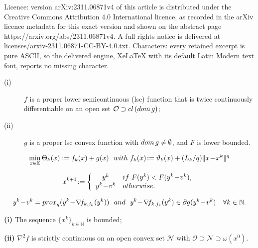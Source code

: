 \documentclass[10pt,a4paper]{amsart}
\begin{document}
Licence: version arXiv:2311.06871v4 of this article is distributed under the Creative Commons Attribution 4.0 International licence, as recorded in the arXiv licence metadata for this exact version and shown on the abstract page https://arxiv.org/abs/2311.06871v4. A full rights notice is delivered at licenses/arxiv-2311.06871-CC-BY-4.0.txt. Characters: every retained excerpt is pure ASCII, so the delivered engine, XeLaTeX with its default Latin Modern text font, reports no missing character.
\begin{aassumption}\label{ass1}
\begin{description}
 \item[(i)] $f$ is a proper lower semicontinuous (lsc) function that is twice continuously differentiable on an open set $\mathcal{O}\supset{\rm cl}\,({\rm dom}\,g)$;
		
 \item[(ii)] $g$ is a proper lsc convex function with ${\rm dom}\,g\ne\emptyset$, and $F$ is lower bounded.
\end{description} 
\end{aassumption}

\begin{equation}\label{subprobk}
 \min_{x\in\mathbb{X}}\Theta_k(x):=f_k(x)+g(x)\ \ {\rm with}\ f_k(x)\!:=\vartheta_k(x)+({L_k}/q)\|x\!-\!x^k\|^q
\end{equation}

		\begin{equation}\label{new-iter}
			x^{k+1}\!:=\left\{\begin{array}{cl}
				y^k &{\rm if}\ F(y^k)<F(y^k\!-\!v^k),\\
				y^k\!-\!v^k &{\rm  otherwise}.
			\end{array}\right.
		\end{equation}

 \begin{equation}\label{yk-vk}
  y^k\!-\!v^k={\rm prox}_{g}(y^k\!-\!\nabla\!f_{k,j_k}(y^k))\ \ {\rm and}\  \ y^k\!-\!\nabla\!f_{k,j_k}(y^k)\in\partial g(y^k\!-\!v^k)\quad\forall k\in\mathbb{N}.
 \end{equation}

\begin{aassumption}\label{ass2}
{\bf(i)} The sequence $\{x^k\}_{k\in\mathbb{N}}$ is bounded; 
	
 \noindent
 {\bf(ii)} $\nabla^2\!f$ is strictly continuous on an open convex set $\mathcal{N}$ with $\mathcal{O}\supset\mathcal{N}\!\supset\omega(x^0)$.
\end{aassumption}
\end{document}
